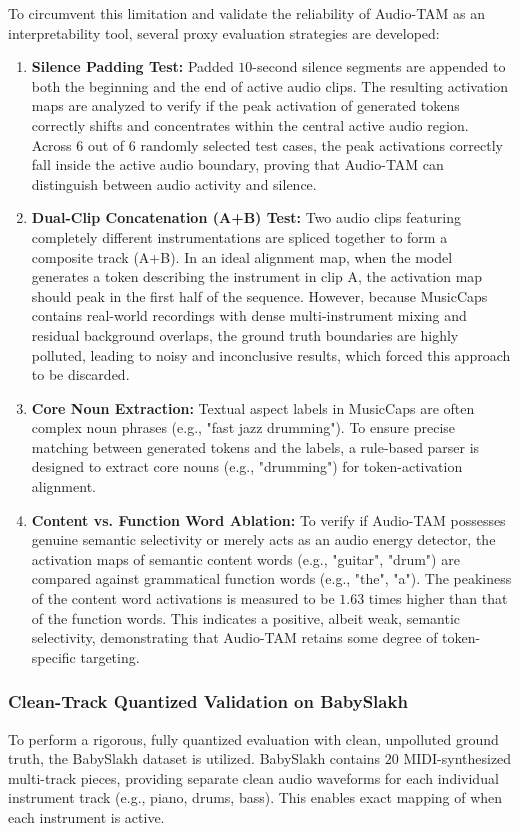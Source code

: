 \documentclass[12pt, conference, letterpaper]{IEEEtran}
\begin{document}
To circumvent this limitation and validate the reliability of Audio-TAM as an interpretability tool, several proxy evaluation strategies are developed:
\begin{enumerate}
    \item \textbf{Silence Padding Test:} Padded $10$-second silence segments are appended to both the beginning and the end of active audio clips. The resulting activation maps are analyzed to verify if the peak activation of generated tokens correctly shifts and concentrates within the central active audio region. Across $6$ out of $6$ randomly selected test cases, the peak activations correctly fall inside the active audio boundary, proving that Audio-TAM can distinguish between audio activity and silence.
    \item \textbf{Dual-Clip Concatenation (A+B) Test:} Two audio clips featuring completely different instrumentations are spliced together to form a composite track (A+B). In an ideal alignment map, when the model generates a token describing the instrument in clip A, the activation map should peak in the first half of the sequence. However, because MusicCaps contains real-world recordings with dense multi-instrument mixing and residual background overlaps, the ground truth boundaries are highly polluted, leading to noisy and inconclusive results, which forced this approach to be discarded.
    \item \textbf{Core Noun Extraction:} Textual aspect labels in MusicCaps are often complex noun phrases (e.g., "fast jazz drumming"). To ensure precise matching between generated tokens and the labels, a rule-based parser is designed to extract core nouns (e.g., "drumming") for token-activation alignment.
    \item \textbf{Content vs. Function Word Ablation:} To verify if Audio-TAM possesses genuine semantic selectivity or merely acts as an audio energy detector, the activation maps of semantic content words (e.g., "guitar", "drum") are compared against grammatical function words (e.g., "the", "a"). The peakiness of the content word activations is measured to be $1.63$ times higher than that of the function words. This indicates a positive, albeit weak, semantic selectivity, demonstrating that Audio-TAM retains some degree of token-specific targeting.
\end{enumerate}

\subsubsection{Clean-Track Quantized Validation on BabySlakh}
To perform a rigorous, fully quantized evaluation with clean, unpolluted ground truth, the BabySlakh dataset is utilized. BabySlakh contains $20$ MIDI-synthesized multi-track pieces, providing separate clean audio waveforms for each individual instrument track (e.g., piano, drums, bass). This enables exact mapping of when each instrument is active.
\end{document}
